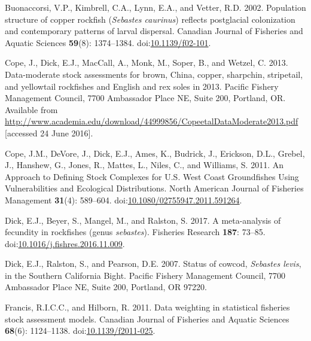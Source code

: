 \documentclass[11pt,
  english,
  letterpaper,
]{article}
\newlength{\cslhangindent}
\newenvironment{CSLReferences}[2] %
 {%
  \setlength{\parindent}{0pt}
  \ifodd #1 \everypar{\setlength{\hangindent}{\cslhangindent}}\ignorespaces\fi
  \ifnum #2 > 0
  \setlength{\parskip}{#2\baselineskip}
  \fi
 }%
 {}
\begin{document}
\begin{CSLReferences}{1}{0}
\leavevmode{}%
Buonaccorsi, V.P., Kimbrell, C.A., Lynn, E.A., and Vetter, R.D. 2002. Population structure of copper rockfish (\emph{{Sebastes} caurinus}) reflects postglacial colonization and contemporary patterns of larval dispersal. Canadian Journal of Fisheries and Aquatic Sciences \textbf{59}(8): 1374--1384. doi:\href{https://doi.org/10.1139/f02-101}{10.1139/f02-101}.

\leavevmode{}%
Cope, J., Dick, E.J., MacCall, A., Monk, M., Soper, B., and Wetzel, C. 2013. Data-moderate stock assessments for brown, {China}, copper, sharpchin, stripetail, and yellowtail rockfishes and {English} and rex soles in 2013. Pacific Fishery Management Council, 7700 Ambassador Place NE, Suite 200, Portland, OR. Available from \url{http://www.academia.edu/download/44999856/CopeetalDataModerate2013.pdf} {[}accessed 24 June 2016{]}.

\leavevmode{}%
Cope, J.M., DeVore, J., Dick, E.J., Ames, K., Budrick, J., Erickson, D.L., Grebel, J., Hanshew, G., Jones, R., Mattes, L., Niles, C., and Williams, S. 2011. An {Approach} to {Defining} {Stock} {Complexes} for {U}.{S}. {West} {Coast} {Groundfishes} {Using} {Vulnerabilities} and {Ecological} {Distributions}. North American Journal of Fisheries Management \textbf{31}(4): 589--604. doi:\href{https://doi.org/10.1080/02755947.2011.591264}{10.1080/02755947.2011.591264}.

\leavevmode{}%
Dick, E.J., Beyer, S., Mangel, M., and Ralston, S. 2017. A meta-analysis of fecundity in rockfishes (genus \emph{sebastes}). Fisheries Research \textbf{187}: 73--85. doi:\href{https://doi.org/10.1016/j.fishres.2016.11.009}{10.1016/j.fishres.2016.11.009}.

\leavevmode{}%
Dick, E.J., Ralston, S., and Pearson, D.E. 2007. Status of cowcod, \emph{{Sebastes} levis}, in the {Southern} {California} {Bight}. Pacific Fishery Management Council, 7700 Ambassador Place NE, Suite 200, Portland, OR 97220.

\leavevmode{}%
Francis, R.I.C.C., and Hilborn, R. 2011. Data weighting in statistical fisheries stock assessment models. Canadian Journal of Fisheries and Aquatic Sciences \textbf{68}(6): 1124--1138. doi:\href{https://doi.org/10.1139/f2011-025}{10.1139/f2011-025}.


\end{CSLReferences}
\end{document}
